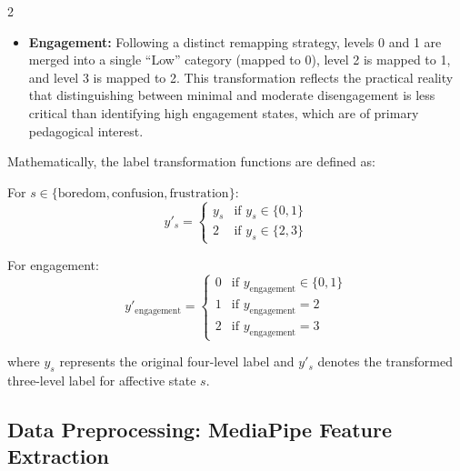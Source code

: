\begin{multicols}{2}
\begin{itemize}[leftmargin=*]
    \item \textbf{Engagement:} Following a distinct remapping strategy, levels 0 and 1 are merged into a single ``Low'' category (mapped to 0), level 2 is mapped to 1, and level 3 is mapped to 2. This transformation reflects the practical reality that distinguishing between minimal and moderate disengagement is less critical than identifying high engagement states, which are of primary pedagogical interest.
  \end{itemize}

  Mathematically, the label transformation functions are defined as:

  For $s \in \{\text{boredom}, \text{confusion}, \text{frustration}\}$:
  \begin{equation}
    y'_s =
    \begin{cases}
      y_s & \text{if } y_s \in \{0, 1\} \\
      2 & \text{if } y_s \in \{2, 3\}
    \end{cases}
  \end{equation}

  For engagement:
  \begin{equation}
    y'_{\text{engagement}} =
    \begin{cases}
      0 & \text{if } y_{\text{engagement}} \in \{0, 1\} \\
      1 & \text{if } y_{\text{engagement}} = 2 \\
      2 & \text{if } y_{\text{engagement}} = 3
    \end{cases}
  \end{equation}

  \noindent where $y_s$ represents the original four-level label and $y'_s$ denotes the transformed three-level label for affective state $s$.

  \subsection{Data Preprocessing: MediaPipe Feature Extraction}



\end{multicols}
